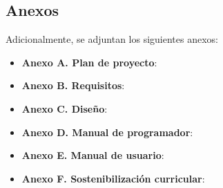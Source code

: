 \subsection{Anexos}
Adicionalmente, se adjuntan los siguientes anexos:
\begin{itemize}
    \item \textbf{Anexo A. Plan de proyecto}:
    \item \textbf{Anexo B. Requisitos}:
    \item \textbf{Anexo C. Diseño}:
    \item \textbf{Anexo D. Manual de programador}:
    \item \textbf{Anexo E. Manual de usuario}:
    \item \textbf{Anexo F. Sostenibilización curricular}:
\end{itemize}